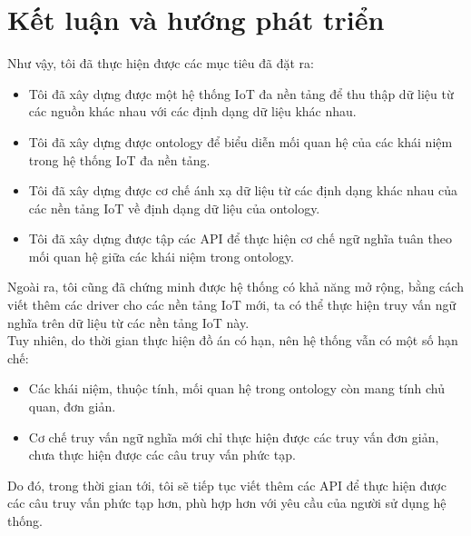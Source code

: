 \chapter{Kết luận và hướng phát triển}

Như vậy, tôi đã thực hiện được các mục tiêu đã đặt ra:
\begin{itemize}
	\item Tôi đã xây dựng được một hệ thống IoT đa nền tảng để thu thập dữ liệu từ các nguồn khác nhau với các định dạng dữ liệu khác nhau.
	\item Tôi đã xây dựng được ontology để biểu diễn mối quan hệ của các khái niệm trong hệ thống IoT đa nền tảng.
	\item Tôi đã xây dựng được cơ chế ánh xạ dữ liệu từ các định dạng khác nhau của các nền tảng IoT về định dạng dữ liệu của ontology.
	\item Tôi đã xây dựng được tập các API để thực hiện cơ chế ngữ nghĩa tuân theo mối quan hệ giữa các khái niệm trong ontology.
\end{itemize}
Ngoài ra, tôi cũng đã chứng minh được hệ thống có khả năng mở rộng, bằng cách viết thêm các driver cho các nền tảng IoT mới, ta có thể thực hiện truy vấn ngữ nghĩa trên dữ liệu từ các nền tảng IoT này.\\
Tuy nhiên, do thời gian thực hiện đồ án có hạn, nên hệ thống vẫn có một số hạn chế:
\begin{itemize}
	\item Các khái niệm, thuộc tính, mối quan hệ trong ontology còn mang tính chủ quan, đơn giản.
	\item Cơ chế truy vấn ngữ nghĩa mới chỉ thực hiện được các truy vấn đơn giản, chưa thực hiện được các câu truy vấn phức tạp.
\end{itemize}

Do đó, trong thời gian tới, tôi sẽ tiếp tục viết thêm các API để thực hiện được các câu truy vấn phức tạp hơn, phù hợp hơn với yêu cầu của người sử dụng hệ thống.



